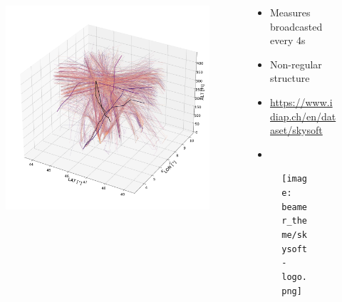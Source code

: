 \documentclass[aspectratio=169]{beamer}
\begin{document}
\begin{frame}
    \begin{columns}
        \begin{column}{0.5\textwidth}
            \begin{figure}[htbp]
                \includegraphics[height=0.83\textheight]{imgs/dataset.pdf}
            \end{figure}
        \end{column}
        \begin{column}{0.5\textwidth}
            \vspace{10pt}
            \begin{itemize}
                \item Measures broadcasted every 4s
                \item Non-regular structure
                \item \url{https://www.idiap.ch/en/dataset/skysoft}
                \item \cite{skysoft2021dataset}
            \end{itemize}
            \begin{figure}[htbp]
                \centering
                \texttt{[image: beamer\_theme/skysoft-logo.png]}
            \end{figure}
        \end{column}
    \end{columns}
\end{frame}
\end{document}
